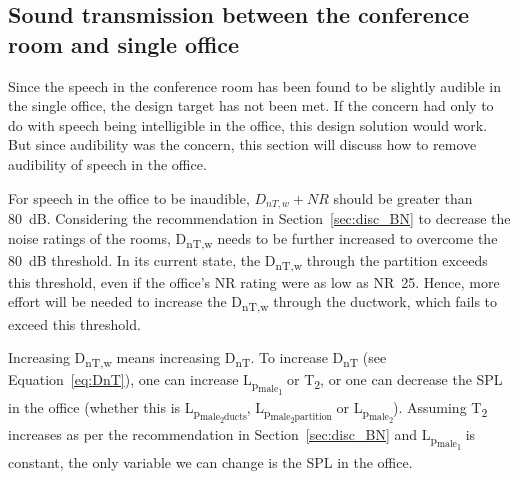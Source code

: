 



\subsection{Sound transmission between the conference room and single office}

Since the speech in the conference room has been found to be slightly audible in the single office, the design target has not been met.
If the concern had only to do with speech being intelligible in the office, this design solution would work.
But since audibility was the concern, this section will discuss how to remove audibility of speech in the office.

For speech in the office to be inaudible, $D_{nT,w} + NR$ should be greater than 80~dB.
Considering the recommendation in Section~\ref{sec:disc_BN} to decrease the noise ratings of the rooms, D\textsubscript{nT,w} needs to be further increased to overcome the 80~dB threshold.
In its current state, the D\textsubscript{nT,w} through the partition exceeds this threshold, even if the office's NR rating were as low as NR~25.
Hence, more effort will be needed to increase the D\textsubscript{nT,w} through the ductwork, which fails to exceed this threshold.

Increasing D\textsubscript{nT,w} means increasing D\textsubscript{nT}.
To increase D\textsubscript{nT} (see Equation~\ref{eq:DnT}), one can increase L\textsubscript{p\textsubscript{male\textsubscript{1}}} or T\textsubscript{2}, or one can decrease the SPL in the office (whether this is L\textsubscript{p\textsubscript{male\textsubscript{2}ducts}}, L\textsubscript{p\textsubscript{male\textsubscript{2}partition}} or L\textsubscript{p\textsubscript{male\textsubscript{2}}}).
Assuming T\textsubscript{2} increases as per the recommendation in Section~\ref{sec:disc_BN} and L\textsubscript{p\textsubscript{male\textsubscript{1}}} is constant, the only variable we can change is the SPL in the office.

